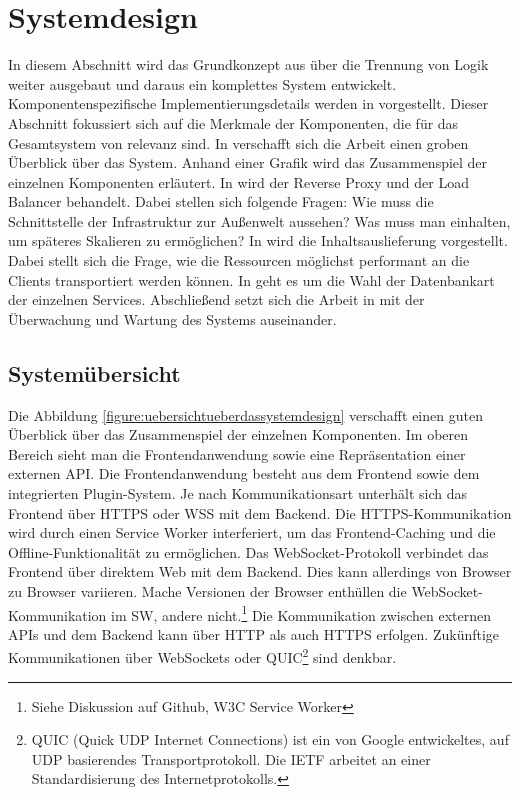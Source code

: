 \section{Systemdesign}
\label{sec:systemdesign}
In diesem Abschnitt wird das Grundkonzept aus 
über die Trennung von Logik weiter ausgebaut und daraus ein komplettes System
entwickelt. Komponentenspezifische Implementierungsdetails
werden in  vorgestellt. 
Dieser Abschnitt fokussiert sich auf die Merkmale der Komponenten,
die für das Gesamtsystem von relevanz sind. In  verschafft
sich die Arbeit einen groben Überblick über das System. Anhand einer Grafik wird das Zusammenspiel
der einzelnen Komponenten erläutert. In  
wird der Reverse Proxy und der Load Balancer behandelt.
Dabei stellen sich folgende Fragen: Wie muss die Schnittstelle der
Infrastruktur zur Außenwelt aussehen? Was muss man einhalten, um späteres
Skalieren zu ermöglichen? In  wird
die Inhaltsauslieferung vorgestellt. Dabei stellt sich die Frage,
wie die Ressourcen möglichst performant an die Clients transportiert
werden können. In  geht es um die Wahl
der Datenbankart der einzelnen Services. Abschließend setzt sich die Arbeit
in  mit der Überwachung und Wartung
des Systems auseinander.

\subsection{Systemübersicht}
\label{subsec:systemuebersicht}
Die Abbildung \ref{figure:uebersichtueberdassystemdesign} verschafft einen guten Überblick
über das Zusammenspiel der einzelnen Komponenten. Im oberen Bereich sieht man die
Frontendanwendung sowie eine Repräsentation einer externen API. Die Frontendanwendung
besteht aus dem Frontend sowie dem integrierten Plugin-System. Je nach Kommunikationsart
unterhält sich das Frontend über HTTPS oder WSS mit dem Backend. Die HTTPS-Kommunikation
wird durch einen Service Worker interferiert, um das Frontend-Caching und die
Offline-Funktionalität zu ermöglichen. Das WebSocket-Protokoll verbindet das Frontend
über direktem Web mit dem Backend. Dies kann allerdings von Browser zu Browser variieren.
Mache Versionen der Browser enthüllen die WebSocket-Kommunikation im SW, andere
nicht.\footnote{Siehe Diskussion auf Github, W3C Service Worker\cite{GithubIssueWebSocketExpose}}
Die Kommunikation zwischen externen APIs und dem Backend kann über HTTP als auch
HTTPS erfolgen. Zukünftige Kommunikationen über WebSockets oder QUIC\footnote{QUIC (Quick UDP Internet Connections) ist ein von Google entwickeltes, auf UDP basierendes Transportprotokoll.\cite{IETFQUICWhatsHappening} Die IETF arbeitet an einer Standardisierung des Internetprotokolls.\cite{DatatrakcerIETFQuic}}
sind denkbar.

